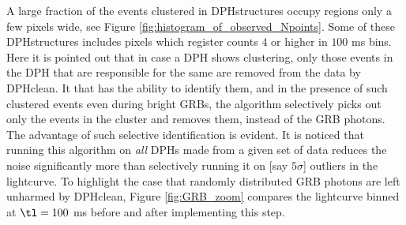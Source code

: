 A large fraction of the events clustered in DPHstructures occupy regions only a few pixels wide, see Figure \ref{fig:histogram_of_observed_Npoints}. Some of these DPHstructures includes pixels which register counts $4$ or higher in $100$ ms bins. Here it is pointed out that in case a DPH shows clustering, only those events in the DPH that are responsible for the same are removed from the data by DPHclean. It that has the ability to identify them, and in the presence of such clustered events even during bright GRBs, the algorithm selectively picks out only the events in the cluster and removes them, instead of the GRB photons. The advantage of such selective identification is evident. It is noticed that running this algorithm on \emph{all} DPHs made from a given set of data reduces the noise significantly more than selectively running it on [say $5 \sigma$] outliers in the lightcurve. To highlight the case that randomly distributed GRB photons are left unharmed by DPHclean, Figure \ref{fig:GRB_zoom} compares the lightcurve binned at $\tl = 100$ ms before and after implementing this step.


